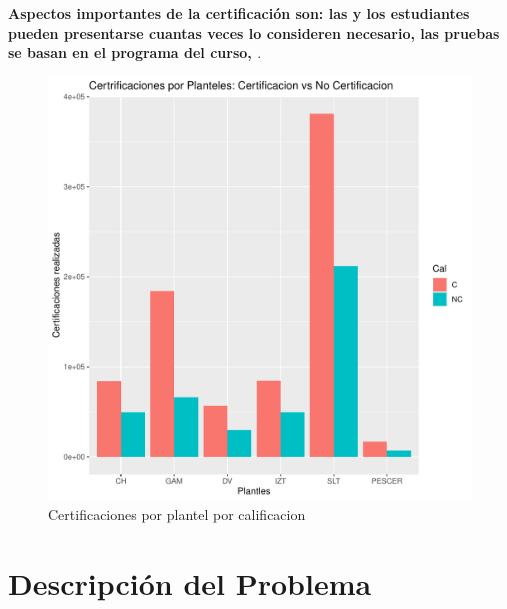 \documentclass[12pt]{article}
\begin{document}
\textbf{Aspectos importantes de la certificaci\'on son: las y los estudiantes pueden presentarse cuantas veces lo consideren necesario, las pruebas se basan en el programa del curso, \cite{Doc3}}.


\begin{figure}
\centering
\includegraphics[scale=0.45]{Graficas/ggplotBarplotPlantelCal2.pdf}
\caption{Certificaciones por plantel por calificacion}
\label{Fig.Cert.Plantel-Cal2}
\end{figure}



\section{Descripci\'on del Problema}
\end{document}
